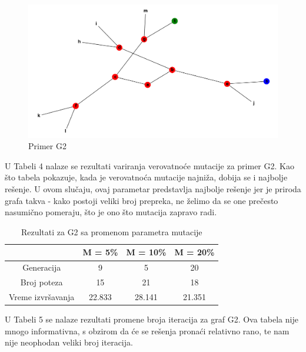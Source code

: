\documentclass[12pt]{article}
\begin{document}
\begin{figure}[h!]
	\begin{center}
		\includegraphics[scale=0.45]{g2.png}
	\end{center}
	\caption{Primer G2}
	\label{fig:slika3}
\end{figure}

 \par U Tabeli 4 nalaze se rezultati variranja verovatnoće mutacije za primer G2. Kao što tabela pokazuje, kada je verovatnoća mutacije najniža, dobija se i najbolje rešenje. U ovom slučaju, ovaj parametar predstavlja najbolje rešenje jer je priroda grafa takva - kako postoji veliki broj prepreka, ne želimo da se one prečesto nasumično pomeraju, što je ono što mutacija zapravo radi. 

	\begin {table}[H]
	\begin{center}
		\caption {Rezultati za G2 sa promenom parametra mutacije} \label{tab:title} 
		\begin{tabular}{|| c|c c c||} 	
			\hline
			& M = 5\% & M = 10\% & M = 20\% \\ 
			\hline\hline
			Generacija & 9 & 5 & 20  \\ 
			\hline
			Broj poteza & 15 & 21 & 18 \\
			\hline
			Vreme izvršavanja & 22.833 & 28.141 & 21.351 \\
			\hline
		\end{tabular}
	\end{center}
\end{table}

	\par U Tabeli 5 se nalaze rezultati promene broja iteracija za graf G2. Ova tabela nije mnogo informativna, s obzirom da će se rešenja pronaći relativno rano, te nam nije neophodan veliki broj iteracija. 
\end{document}
